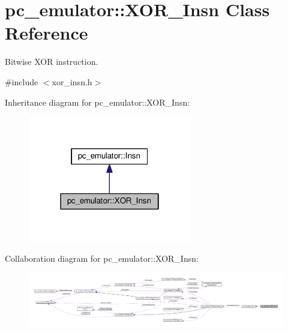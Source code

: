 \hypertarget{classpc__emulator_1_1XOR__Insn}{}\section{pc\+\_\+emulator\+:\+:X\+O\+R\+\_\+\+Insn Class Reference}
\label{classpc__emulator_1_1XOR__Insn}


Bitwise X\+OR instruction.  




{\ttfamily \#include $<$xor\+\_\+insn.\+h$>$}



Inheritance diagram for pc\+\_\+emulator\+:\+:X\+O\+R\+\_\+\+Insn\+:\nopagebreak
\begin{figure}[H]
\begin{center}
\leavevmode
\includegraphics[width=202pt]{classpc__emulator_1_1XOR__Insn__inherit__graph}
\end{center}
\end{figure}


Collaboration diagram for pc\+\_\+emulator\+:\+:X\+O\+R\+\_\+\+Insn\+:\nopagebreak
\begin{figure}[H]
\begin{center}
\leavevmode
\includegraphics[width=350pt]{classpc__emulator_1_1XOR__Insn__coll__graph}
\end{center}
\end{figure}
